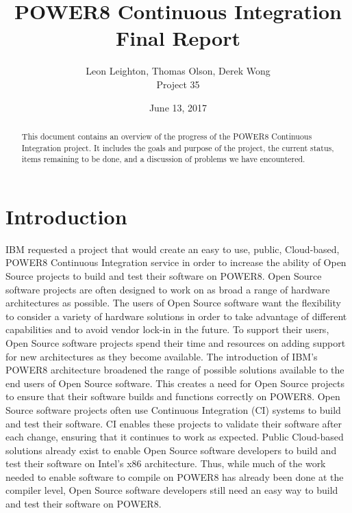 \documentclass[10pt,letterpaper,onecolumn,draftclsnofoot]{IEEEtran}
\begin{document}
\begin{titlepage}
  \title{POWER8 Continuous Integration\\ Final Report}
  \author{Leon Leighton, Thomas Olson, Derek Wong\\Project 35}
  \date{June 13, 2017}
  \maketitle
  \vspace{4cm}
  \begin{abstract}
  \noindent This document contains an overview of the progress of the POWER8 Continuous Integration project.
    It includes the goals and purpose of the project, the current status, items remaining to be done, 
    and a discussion of problems we have encountered. 
 \end{abstract}
\end{titlepage}

\setcounter{tocdepth}{2}
\tableofcontents
\clearpage
\section{Introduction}
IBM requested a project that would create an easy to use, public, Cloud-based, 
POWER8 Continuous Integration service in order to increase the ability
of Open Source projects to build and test their software on POWER8.
Open Source software projects are often designed to work on as broad a range of hardware architectures as possible. 
The users of Open Source software want the flexibility to consider a variety of hardware solutions in order to take advantage of different capabilities and to avoid vendor lock-in in the future. 
To support their users, Open Source software projects spend their time and resources on adding support for new architectures as they become available. 
The introduction of IBM's POWER8 architecture broadened the range of possible solutions available to the end users of Open Source software. 
This creates a need for Open Source projects to ensure that their software builds and functions correctly on POWER8. 
Open Source software projects often use Continuous Integration (CI) systems to build and test their software. 
CI enables these projects to validate their software after each change, ensuring that it continues to work as expected. 
Public Cloud-based solutions already exist to enable Open Source software developers to build and test their software on Intel's x86 architecture. 
Thus, while much of the work needed to enable software to compile on POWER8 has already been done at the compiler level, Open Source software developers still need an easy way to build and test their software on POWER8. 
\end{document}
